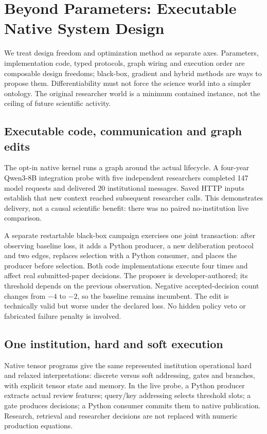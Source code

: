 \section{Beyond Parameters: Executable Native System Design}
\label{sec:native-design}

We treat design freedom and optimization method as separate axes. Parameters,
implementation code, typed protocols, graph wiring and execution order are
composable design freedoms; black-box, gradient and hybrid methods
are ways to propose them. Differentiability must not force the science world
into a simpler ontology. The original researcher world is a minimum contained
instance, not the ceiling of future scientific activity.

\subsection{Executable code, communication and graph edits}

The opt-in native kernel runs a \systemspec{} graph around the actual
\suto{} lifecycle. A four-year Qwen3-8B integration probe with five independent
researchers completed 147 model requests and delivered 20 institutional
messages. Saved HTTP inputs establish that new context reached subsequent
researcher calls. This demonstrates delivery, not a causal scientific benefit:
there was no paired no-institution live comparison.

A separate restartable black-box campaign exercises one joint transaction:
after observing baseline loss, it adds a Python producer, a new deliberation
protocol and two edges, replaces selection with a Python consumer, and places
the producer before selection. Both code implementations execute four times
and affect real submitted-paper decisions. The proposer is developer-authored;
its threshold depends on the previous observation. Negative accepted-decision
count changes from $-4$ to $-2$, so the baseline remains incumbent. The edit is
technically valid but worse under the declared loss. No hidden policy veto or
fabricated failure penalty is involved.

\subsection{One institution, hard and soft execution}

Native tensor programs give the same represented institution operational hard
and relaxed interpretations: discrete versus soft addressing, gates and
branches, with explicit tensor state and memory. In the live probe, a Python
producer extracts actual review features; query/key addressing selects
threshold slots; a gate produces decisions; a Python consumer commits them to
native publication. Research, retrieval and researcher decisions are not
replaced with numeric production equations.

